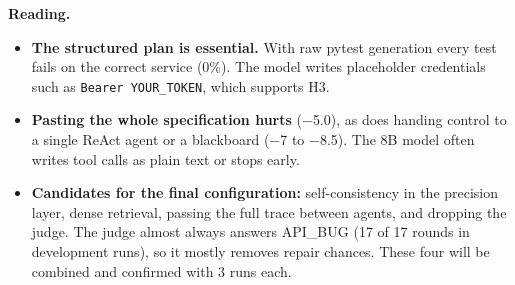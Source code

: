 \documentclass[11pt,a4paper]{article}
\begin{document}
\textbf{Reading.}
\begin{itemize}
\item \textbf{The structured plan is essential.} With raw pytest generation every test fails on the correct service (0\%). The model writes placeholder credentials such as \texttt{Bearer YOUR\_TOKEN}, which supports H3.
\item \textbf{Pasting the whole specification hurts} ($-$5.0), as does handing control to a single ReAct agent or a blackboard ($-$7 to $-$8.5). The 8B model often writes tool calls as plain text or stops early.
\item \textbf{Candidates for the final configuration:} self-consistency in the precision layer, dense retrieval, passing the full trace between agents, and dropping the judge. The judge almost always answers \textsc{API\_BUG} (17 of 17 rounds in development runs), so it mostly removes repair chances. These four will be combined and confirmed with 3 runs each.
\end{itemize}
\end{document}
